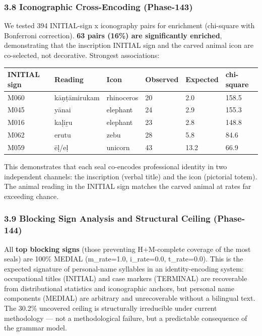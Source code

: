 \documentclass[
]{article}
\newcounter{none} %
\begin{document}
\subsubsection{3.8 Iconographic Cross-Encoding
(Phase-143)}\label{iconographic-cross-encoding-phase-143}

We tested 394 INITIAL-sign x iconography pairs for enrichment
(chi-square with Bonferroni correction). \textbf{63 pairs (16\%) are
significantly enriched}, demonstrating that the inscription INITIAL sign
and the carved animal icon are co-selected, not decorative. Strongest
associations:

{\def\LTcaptype{none} %
\begin{longtable}[]{@{}llllll@{}}
\toprule\noalign{}
INITIAL sign & Reading & Icon & Observed & Expected & chi-square \\
\midrule\noalign{}
\endhead
\bottomrule\noalign{}
\endlastfoot
M060 & kāṇṭāmirukam & rhinoceros & 20 & 2.0 & 158.5 \\
M045 & yānai & elephant & 24 & 2.9 & 155.3 \\
M016 & kaḷiṟu & elephant & 23 & 2.8 & 148.8 \\
M062 & erutu & zebu & 28 & 5.8 & 84.6 \\
M059 & ēḷ/eḷ & unicorn & 43 & 13.2 & 66.9 \\
\end{longtable}
}

This demonstrates that each seal co-encodes professional identity in two
independent channels: the inscription (verbal title) and the icon
(pictorial totem). The animal reading in the INITIAL sign matches the
carved animal at rates far exceeding chance.

\subsubsection{3.9 Blocking Sign Analysis and Structural Ceiling
(Phase-144)}\label{blocking-sign-analysis-and-structural-ceiling-phase-144}

All \textbf{top blocking signs} (those preventing H+M-complete coverage of the most seals) are 100\% MEDIAL (m\_rate=1.0, i\_rate=0.0,
t\_rate=0.0). This is the expected signature of personal-name syllables
in an identity-encoding system: occupational titles (INITIAL) and case
markers (TERMINAL) are recoverable from distributional statistics and
iconographic anchors, but personal name components (MEDIAL) are
arbitrary and unrecoverable without a bilingual text. The 30.2\%
uncovered ceiling is structurally irreducible under current methodology
--- not a methodological failure, but a predictable consequence of the
grammar model.
\end{document}
